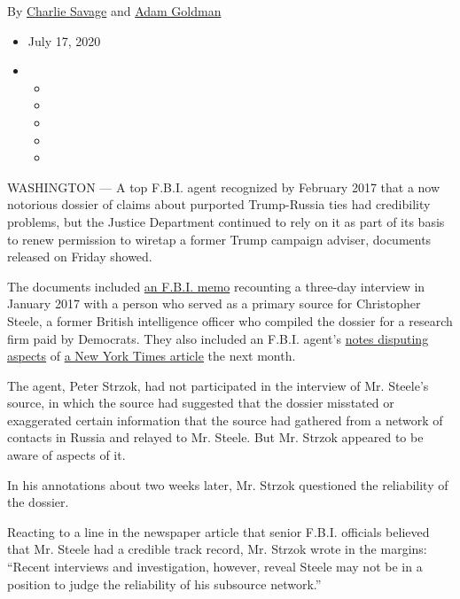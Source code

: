 By \href{https://www.nytimes.com/by/charlie-savage}{Charlie Savage} and
\href{https://www.nytimes.com/by/adam-goldman}{Adam Goldman}

\begin{itemize}
\item
  July 17, 2020
\item
  \begin{itemize}
  \item
  \item
  \item
  \item
  \item
  \end{itemize}
\end{itemize}

WASHINGTON --- A top F.B.I. agent recognized by February 2017 that a now
notorious dossier of claims about purported Trump-Russia ties had
credibility problems, but the Justice Department continued to rely on it
as part of its basis to renew permission to wiretap a former Trump
campaign adviser, documents released on Friday showed.

The documents included
\href{https://www.judiciary.senate.gov/download/february-9-2017-electronic-communication}{an
F.B.I. memo} recounting a three-day interview in January 2017 with a
person who served as a primary source for Christopher Steele, a former
British intelligence officer who compiled the dossier for a research
firm paid by Democrats. They also included an F.B.I. agent's
\href{https://www.judiciary.senate.gov/imo/media/doc/Annotated\%20New\%20York\%20Times\%20Article.pdf}{notes
disputing aspects} of
\href{https://www.nytimes.com/2017/02/14/us/politics/russia-intelligence-communications-trump.html}{a
New York Times article} the next month.

The agent, Peter Strzok, had not participated in the interview of Mr.
Steele's source, in which the source had suggested that the dossier
misstated or exaggerated certain information that the source had
gathered from a network of contacts in Russia and relayed to Mr. Steele.
But Mr. Strzok appeared to be aware of aspects of it.

In his annotations about two weeks later, Mr. Strzok questioned the
reliability of the dossier.

Reacting to a line in the newspaper article that senior F.B.I. officials
believed that Mr. Steele had a credible track record, Mr. Strzok wrote
in the margins: ``Recent interviews and investigation, however, reveal
Steele may not be in a position to judge the reliability of his
subsource network.''

